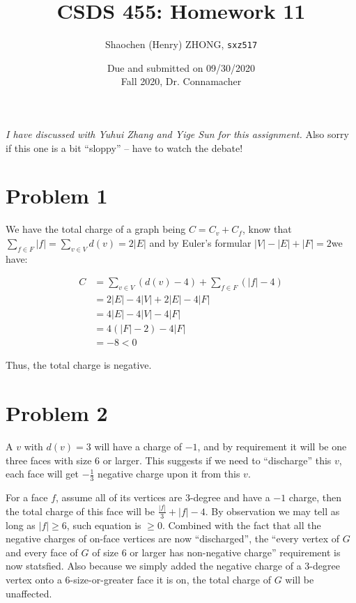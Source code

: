 \documentclass[11pt]{article}
\newcommand{\ilc}{\texttt}
\begin{document}
\title{\textbf{CSDS 455: Homework 11}}

\author{Shaochen (Henry) ZHONG, \ilc{sxz517}}
\date{Due and submitted on 09/30/2020 \\ Fall 2020, Dr. Connamacher}
\maketitle

\textit{I have discussed with Yuhui Zhang and Yige Sun for this assignment.} Also sorry if this one is a bit ``sloppy'' -- have to watch the debate!

\section*{Problem 1}

We have the total charge of a graph being $C = C_v + C_f$, know that $\sum_{f \in F}|f| = \sum_{v \in V} d(v) = 2|E|$ and by Euler's formular $|V| - |E| + |F| = 2$we have:

\begin{align*}
    C &= \sum_{v \in V}(d(v) - 4) + \sum_{f \in F}(|f| - 4) \\
    &= 2|E| - 4|V| + 2|E| - 4|F| \\
    &= 4|E| - 4|V| - 4|F| \\
    &= 4(|F| - 2) - 4|F| \\
    &= -8 < 0
\end{align*}

Thus, the total charge is negative.





\section*{Problem 2}

A $v$ with $d(v) = 3$ will have a charge of $-1$, and by requirement it will be one three faces with size 6 or larger. This suggests if we need to ``discharge'' this $v$, each face will get $-\frac{1}{3}$ negative charge upon it from this $v$.

For a face $f$, assume all of its vertices are 3-degree and have a $-1$ charge, then the total charge of this face will be $\frac{|f|}{3} + |f| - 4$. By observation we may tell as long as $|f| \geq 6$, such equation is $\geq 0$. Combined with the fact that all the negative charges of on-face vertices are now ``discharged'', the ``every vertex of $G$ and every face of $G$ of size 6 or larger has non-negative charge'' requirement is now statsfied. Also because we simply added the negative charge of a 3-degree vertex onto a 6-size-or-greater face it is on, the total charge of $G$ will be unaffected.
\end{document}

